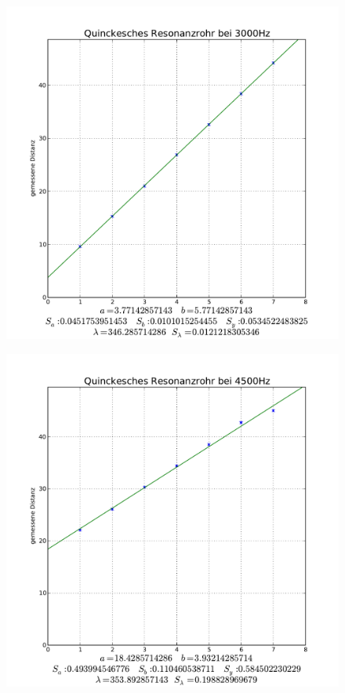 \documentclass[12pt,a4paper]{article}
\begin{document}
\begin{figure}[hbt]
	\centering
	\includegraphics[width=15cm]{3000Hz}
	\label{Bild1}
\end{figure}
\begin{figure}[hbt]
	\centering
	\includegraphics[width=15cm]{4500Hz}
	\label{Bild2}
\end{figure}
\end{document}
